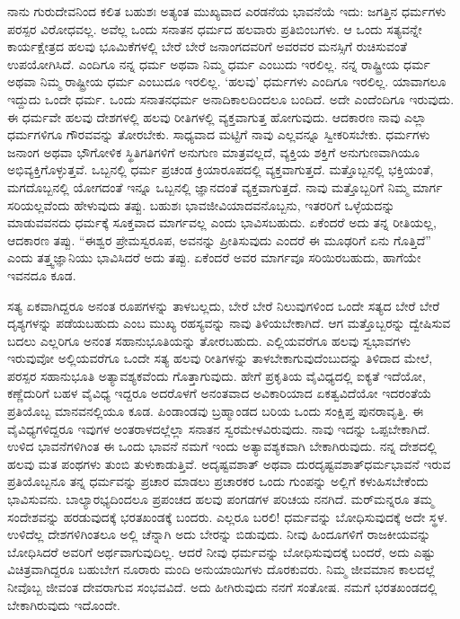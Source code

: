 ನಾನು ಗುರುದೇವನಿಂದ ಕಲಿತ ಬಹುಶಃ ಅತ್ಯಂತ ಮುಖ್ಯವಾದ ಎರಡನೆಯ ಭಾವನೆಯೆ ಇದು: ಜಗತ್ತಿನ ಧರ್ಮಗಳು ಪರಸ್ಪರ ವಿರೋಧವಲ್ಲ. ಅವೆಲ್ಲ ಒಂದು ಸನಾತನ ಧರ್ಮದ ಹಲವಾರು ಪ್ರತಿಬಿಂಬಗಳು. ಆ ಒಂದು ಸತ್ಯವನ್ನೇ ಕಾರ್ಯಕ್ಷೇತ್ರದ ಹಲವು ಭೂಮಿಕೆಗಳಲ್ಲಿ ಬೇರೆ ಬೇರೆ ಜನಾಂಗದವರಿಗೆ ಅವರವರ ಮನಸ್ಸಿಗೆ ರುಚಿಸುವಂತೆ ಉಪಯೋಗಿಸಿದೆ. ಎಂದಿಗೂ ನನ್ನ ಧರ್ಮ ಅಥವಾ ನಿಮ್ಮ ಧರ್ಮ ಎಂಬುದು ಇರಲಿಲ್ಲ. ನನ್ನ ರಾಷ್ಟ್ರೀಯ ಧರ್ಮ ಅಥವಾ ನಿಮ್ಮ ರಾಷ್ಟ್ರೀಯ ಧರ್ಮ ಎಂಬುದೂ ಇರಲಿಲ್ಲ. ‘ಹಲವು’ ಧರ್ಮಗಳು ಎಂದಿಗೂ ಇರಲಿಲ್ಲ. ಯಾವಾಗಲೂ ಇದ್ದುದು ಒಂದೇ ಧರ್ಮ. ಒಂದು ಸನಾತನಧರ್ಮ ಅನಾದಿಕಾಲದಿಂದಲೂ ಬಂದಿದೆ. ಅದೇ ಎಂದೆಂದಿಗೂ ಇರುವುದು. ಈ ಧರ್ಮವೇ ಹಲವು ದೇಶಗಳಲ್ಲಿ ಹಲವು ರೀತಿಗಳಲ್ಲಿ ವ್ಯಕ್ತವಾಗುತ್ತ ಹೋಗುವುದು. ಆದಕಾರಣ ನಾವು ಎಲ್ಲಾ ಧರ್ಮಗಳಿಗೂ ಗೌರವವನ್ನು ತೋರಬೇಕು. ಸಾಧ್ಯವಾದ ಮಟ್ಟಿಗೆ ನಾವು ಎಲ್ಲವನ್ನೂ ಸ್ವೀಕರಿಸಬೇಕು. ಧರ್ಮಗಳು ಜನಾಂಗ ಅಥವಾ ಭೌಗೋಳಿಕ ಸ್ಥಿತಿಗತಿಗಳಿಗೆ ಅನುಗುಣ ಮಾತ್ರವಲ್ಲದೆ, ವ್ಯಕ್ತಿಯ ಶಕ್ತಿಗೆ ಅನುಗುಣವಾಗಿಯೂ ಅಭಿವ್ಯಕ್ತಿಗೊಳ್ಳುತ್ತವೆ. ಒಬ್ಬನಲ್ಲಿ ಧರ್ಮ ಪ್ರಚಂಡ ಕ್ರಿಯಾರೂಪದಲ್ಲಿ ವ್ಯಕ್ತವಾಗುತ್ತದೆ. ಮತ್ತೊಬ್ಬನಲ್ಲಿ ಭಕ್ತಿಯಂತೆ, ಮಗದೊಬ್ಬನಲ್ಲಿ ಯೋಗದಂತೆ ಇನ್ನೂ ಒಬ್ಬನಲ್ಲಿ ಜ್ಞಾನದಂತೆ ವ್ಯಕ್ತವಾಗುತ್ತದೆ. ನಾವು ಮತ್ತೊಬ್ಬರಿಗೆ ನಿಮ್ಮ ಮಾರ್ಗ ಸರಿಯಲ್ಲವೆಂದು ಹೇಳುವುದು ತಪ್ಪು. ಬಹುಶಃ ಭಾವಜೀವಿಯಾದವನೊಬ್ಬನು, ಇತರರಿಗೆ ಒಳ್ಳೆಯದನ್ನು ಮಾಡುವವನದು ಧರ್ಮಕ್ಕೆ ಸೂಕ್ತವಾದ ಮಾರ್ಗವಲ್ಲ ಎಂದು ಭಾವಿಸಬಹುದು. ಏಕೆಂದರೆ ಅದು ತನ್ನ ರೀತಿಯಲ್ಲ, ಆದಕಾರಣ ತಪ್ಪು. “ಈಶ್ವರ ಪ್ರೇಮಸ್ವರೂಪ, ಅವನನ್ನು ಪ್ರೀತಿಸುವುದು ಎಂದರೆ ಈ ಮೂಢರಿಗೆ ಏನು ಗೊತ್ತಿದೆ” ಎಂದು ತತ್ತ್ವಜ್ಞಾನಿಯು ಭಾವಿಸಿದರೆ ಅದು ತಪ್ಪು. ಏಕೆಂದರೆ ಅವರ ಮಾರ್ಗವೂ ಸರಿಯಿರಬಹುದು, ಹಾಗೆಯೇ ಇವನದೂ ಕೂಡ.

ಸತ್ಯ ಏಕವಾಗಿದ್ದರೂ ಅನಂತ ರೂಪಗಳನ್ನು ತಾಳಬಲ್ಲದು, ಬೇರೆ ಬೇರೆ ನಿಲುವುಗಳಿಂದ ಒಂದೇ ಸತ್ಯದ ಬೇರೆ ಬೇರೆ ದೃಶ್ಯಗಳನ್ನು ಪಡೆಯಬಹುದು ಎಂಬ ಮುಖ್ಯ ರಹಸ್ಯವನ್ನು ನಾವು ತಿಳಿಯಬೇಕಾಗಿದೆ. ಆಗ ಮತ್ತೊಬ್ಬರನ್ನು ದ್ವೇಷಿಸುವ ಬದಲು ಎಲ್ಲರಿಗೂ ಅನಂತ ಸಹಾನುಭೂತಿಯನ್ನು ತೋರಬಹುದು. ಎಲ್ಲಿಯವರೆಗೂ ಹಲವು ಸ್ವಭಾವಗಳು ಇರುವುವೋ ಅಲ್ಲಿಯವರೆಗೂ ಒಂದೇ ಸತ್ಯ ಹಲವು ರೀತಿಗಳನ್ನು ತಾಳಬೇಕಾಗುವುದೆಂಬುದನ್ನು ತಿಳಿದಾದ ಮೇಲೆ, ಪರಸ್ಪರ ಸಹಾನುಭೂತಿ ಅತ್ಯಾವಶ್ಯಕವೆಂದು ಗೊತ್ತಾಗುವುದು. ಹೇಗೆ ಪ್ರಕೃತಿಯ ವೈವಿಧ್ಯದಲ್ಲಿ ಐಕ್ಯತೆ ಇದೆಯೋ, ಕಣ್ಣೆದುರಿಗೆ ಬಹಳ ವೈವಿಧ್ಯ ಇದ್ದರೂ ಅದರೊಳಗೆ ಅನಂತವಾದ ಅವಿಕಾರಿಯಾದ ಏಕತ್ವವಿದೆಯೋ ಇದರಂತೆಯೆ ಪ್ರತಿಯೊಬ್ಬ ಮಾನವನಲ್ಲಿಯೂ ಕೂಡ. ಪಿಂಡಾಂಡವು ಬ್ರಹ್ಮಾಂಡದ ಬರಿಯ ಒಂದು ಸಂಕ್ಷಿಪ್ತ ಪುನರಾವೃತ್ತಿ. ಈ ವೈವಿಧ್ಯಗಳಿದ್ದರೂ ಇವುಗಳ ಅಂತರಾಳದಲ್ಲೆಲ್ಲಾ ಸನಾತನ ಸ್ವರಮೇಳವಿರುವುದು. ನಾವು ಇದನ್ನು ಒಪ್ಪಬೇಕಾಗಿದೆ. ಉಳಿದ ಭಾವನೆಗಳಿಗಿಂತ ಈ ಒಂದು ಭಾವನೆ ನಮಗೆ ಇಂದು ಅತ್ಯಾವಶ್ಯಕವಾಗಿ ಬೇಕಾಗಿರುವುದು. ನನ್ನ ದೇಶದಲ್ಲಿ ಹಲವು ಮತ ಪಂಥಗಳು ತುಂಬಿ ತುಳುಕಾಡುತ್ತಿವೆ. ಅದೃಷ್ಟವಶಾತ್​ ಅಥವಾ ದುರದೃಷ್ಟವಶಾತ್​ ಧರ್ಮಭಾವನೆ ಇರುವ ಪ್ರತಿಯೊಬ್ಬನೂ ತನ್ನ ಧರ್ಮವನ್ನು ಪ್ರಚಾರ ಮಾಡಲು ಪ್ರಚಾರಕರ ಒಂದು ಗುಂಪನ್ನು ಅಲ್ಲಿಗೆ ಕಳುಹಿಸಬೇಕೆಂದು ಭಾವಿಸುವನು. ಬಾಲ್ಯಾರಭ್ಯದಿಂದಲೂ ಪ್ರಪಂಚದ ಹಲವು ಪಂಗಡಗಳ ಪರಿಚಯ ನನಗಿದೆ. ಮರ್​ಮನ್ನರೂ ತಮ್ಮ ಸಂದೇಶವನ್ನು ಹರಡುವುದಕ್ಕೆ ಭರತಖಂಡಕ್ಕೆ ಬಂದರು. ಎಲ್ಲರೂ ಬರಲಿ! ಧರ್ಮವನ್ನು ಬೋಧಿಸುವುದಕ್ಕೆ ಅದೇ ಸ್ಥಳ. ಉಳಿದೆಲ್ಲ ದೇಶಗಳಿಗಿಂತಲೂ ಅಲ್ಲಿ ಚೆನ್ನಾಗಿ ಅದು ಬೇರನ್ನು ಬಿಡುವುದು. ನೀವು ಹಿಂದೂಗಳಿಗೆ ರಾಜಕೀಯವನ್ನು ಬೋಧಿಸಿದರೆ ಅವರಿಗೆ ಅರ್ಥವಾಗುವುದಿಲ್ಲ. ಆದರೆ ನೀವು ಧರ್ಮವನ್ನು ಬೋಧಿಸುವುದಕ್ಕೆ ಬಂದರೆ, ಅದು ಎಷ್ಟು ವಿಚಿತ್ರವಾಗಿದ್ದರೂ ಬಹುಬೇಗ ನೂರಾರು ಮಂದಿ ಅನುಯಾಯಿಗಳು ದೊರಕುವರು. ನಿಮ್ಮ ಜೀವಮಾನ ಕಾಲದಲ್ಲೆ ನೀವೊಬ್ಬ ಜೀವಂತ ದೇವರಾಗುವ ಸಂಭವವಿದೆ. ಅದು ಹೀಗಿರುವುದು ನನಗೆ ಸಂತೋಷ. ನಮಗೆ ಭರತಖಂಡದಲ್ಲಿ ಬೇಕಾಗಿರುವುದು ಇದೊಂದೇ.

